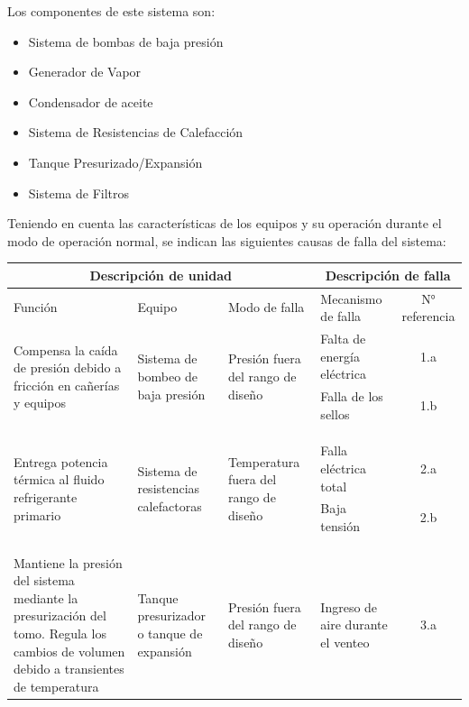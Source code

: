 \documentclass{article}
\begin{document}
Los componentes de este sistema son:
\begin{itemize}
    \item Sistema de bombas de baja presión
    \item Generador de Vapor
    \item Condensador de aceite
    \item Sistema de Resistencias de Calefacción
    \item Tanque Presurizado/Expansión
    \item Sistema de Filtros
\end{itemize}
Teniendo  en  cuenta  las  características  de  los  equipos  y  su  operación durante el modo de operación normal, se indican las siguientes causas de falla del sistema:
\begin{table}[H]
\centering
\begin{tabularx}{\textwidth}{XXXXc}
\toprule
\multicolumn{3}{c}{Descripción de unidad} & \multicolumn{2}{c}{Descripción de falla} \\
\midrule
Función & Equipo & Modo de falla & Mecanismo de \newline falla & N° referencia 
\\
\midrule
\multirow{2}{7em}{Compensa la caída de presión debido a fricción en cañerías y equipos} & \multirow{2}{7em}{Sistema de bombeo de baja presión} & \multirow{2}{7em}{Presión fuera del rango de diseño} & Falta de energía eléctrica & 1.a \\
 & & & Falla de los sellos &  1.b \\ \\ \\ \\\midrule
\multirow{2}{7em}{Entrega potencia térmica al fluido refrigerante primario} & \multirow{2}{7em}{Sistema de resistencias calefactoras} & \multirow{2}{7em}{Temperatura fuera del rango de diseño} & Falla eléctrica \newline total & 2.a \\
& & & Baja tensión &  2.b \\ \\ \\ \\\midrule
\multirow{2}{7em}{Mantiene la presión del sistema mediante la presurización del tomo. Regula los cambios de volumen debido a transientes de temperatura} & \multirow{2}{7em}{Tanque presurizador o tanque de expansión} & \multirow{2}{7em}{Presión fuera del rango de diseño} & Ingreso de aire \newline durante el venteo & 3.a \\

\end{tabularx}
\end{table}
\end{document}
